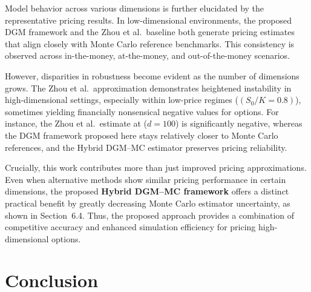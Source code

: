 \documentclass[12pt, a4paper]{article}
\begin{document}
Model behavior across various dimensions is further elucidated by the
representative pricing results. In low-dimensional environments, the
proposed DGM framework and the Zhou et al.\ baseline both generate
pricing estimates that align closely with Monte Carlo reference
benchmarks. This consistency is observed across in-the-money,
at-the-money, and out-of-the-money scenarios.

However, disparities in robustness become evident as the number of
dimensions grows. The Zhou et al.\ approximation demonstrates
heightened instability in high-dimensional settings, especially within
low-price regimes ($(S_0/K = 0.8)$), sometimes yielding financially
nonsensical negative values for options. For instance, the Zhou et al.\
estimate at ($d = 100$) is significantly negative, whereas the DGM
framework proposed here stays relatively closer to Monte Carlo
references, and the Hybrid DGM--MC estimator preserves pricing
reliability.

Crucially, this work contributes more than just improved pricing
approximations. Even when alternative methods show similar pricing
performance in certain dimensions, the proposed \textbf{Hybrid DGM--MC
framework} offers a distinct practical benefit by greatly decreasing
Monte Carlo estimator uncertainty, as shown in Section~6.4. Thus, the
proposed approach provides a combination of competitive accuracy and
enhanced simulation efficiency for pricing high-dimensional options.


\section{Conclusion}



% 
% 




\appendix
\end{document}
